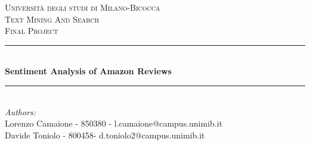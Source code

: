 \begin{titlepage}

\newcommand{\HRule}{\rule{\linewidth}{0.5mm}} %

\center %
 

\textsc{\LARGE Università degli studi di Milano-Bicocca}\\[1cm] %
\textsc{\Large Text Mining And Search}\\[0.3cm] %
\textsc{\large Final Project}\\[0.1cm] %


\HRule \\[0.4cm]
{ \huge \bfseries Sentiment Analysis of Amazon Reviews}\\[0.4cm] %
\HRule \\[1.5cm]
 

\large
\emph{Authors:}\\
Lorenzo Camaione - 850380 - l.camaione@campus.unimib.it \\   %
Davide Toniolo - 800458- d.toniolo2@campus.unimib.it   \\[1cm] %




\end{titlepage}
